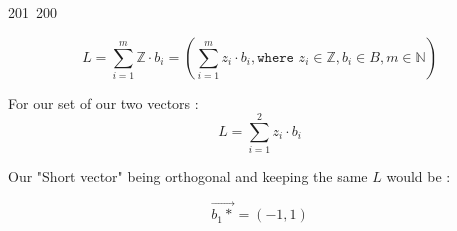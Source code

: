 201~200~\documentclass{article}
\begin{document}
\begin{enumerate}
	                                                                        	                                                                    	                                	                    	                    \[
	                                                                        	                                                                    	                                	                    	                    	        L = \sum_{i=1}^{m} \mathbb{Z} \cdot b_i = \left( \sum_{i=1}^{m}z_i \cdot b_i, \texttt{where } z_i \in\mathbb{Z}, b_i \in B, m \in \mathbb{N}  \right)
	                                                                        	                                                                    	                                	                    	                    	            \]


	                                                                        	                                                                    	                                	                    	                    	                    For our set of our two vectors :
	                                                                        	                                                                    	                                	                    	                    	                        \[
	                                                                        	                                                                    	                                	                    	                    	                        	        L = \sum_{i=1}^{2}z_i \cdot b_i
	                                                                        	                                                                    	                                	                    	                    	                        	            \]

	                                                                        	                                                                    	                                	                    	                    	                        	                Our "Short vector" being orthogonal and keeping the same $L$ would be :

	                                                                        	                                                                    	                                	                    	                    	                        	                        \[
	                                                                        	                                                                    	                                	                    	                    	                        	                        	        \Vec{b_1*} = (-1,1)
	                                                                        	                                                                    	                                	                    	                    	                        	                        	            \]


\end{enumerate}
\end{document}
